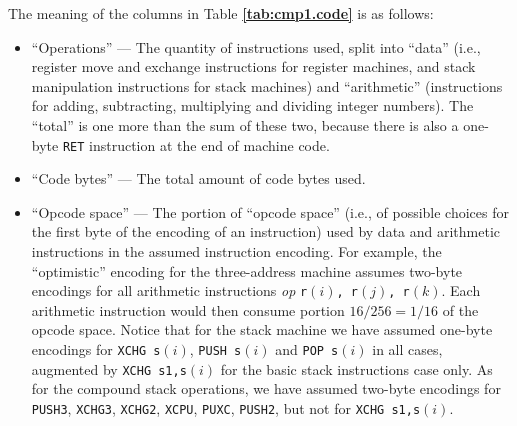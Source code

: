 \documentclass[12pt,oneside]{article}
\def\refpoint#1{{\rm\textbf{\ref{#1}}}}
\let\ptref=\refpoint
\begin{document}
The meaning of the columns in Table \ptref{tab:cmp1.code} is as follows:
\begin{itemize}
\item ``Operations'' --- The quantity of instructions used, split into ``data'' (i.e., register move and exchange instructions for register machines, and stack manipulation instructions for stack machines) and ``arithmetic'' (instructions for adding, subtracting, multiplying and dividing integer numbers). The ``total'' is one more than the sum of these two, because there is also a one-byte \texttt{RET} instruction at the end of machine code.
\item ``Code bytes'' --- The total amount of code bytes used.
\item ``Opcode space'' --- The portion of ``opcode space'' (i.e., of possible choices for the first byte of the encoding of an instruction) used by data and arithmetic instructions in the assumed instruction encoding. For example, the ``optimistic'' encoding for the three-address machine assumes two-byte encodings for all arithmetic instructions {\em op\/} \texttt{r$(i)$, r$(j)$, r$(k)$}. Each arithmetic instruction would then consume portion $16/256=1/16$ of the opcode space. Notice that for the stack machine we have assumed one-byte encodings for \texttt{XCHG s$(i)$}, \texttt{PUSH s$(i)$} and \texttt{POP s$(i)$} in all cases, augmented by \texttt{XCHG s1,s$(i)$} for the basic stack instructions case only. As for the compound stack operations, we have assumed two-byte encodings for \texttt{PUSH3}, \texttt{XCHG3}, \texttt{XCHG2}, \texttt{XCPU}, \texttt{PUXC}, \texttt{PUSH2}, but not for \texttt{XCHG s1,s$(i)$}.
\end{itemize}
\end{document}
